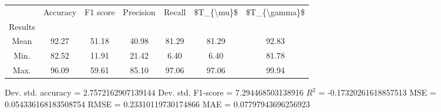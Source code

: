 \begin{tabular}{|c|c|c|c|c|c|c|}
\toprule
{} &  Accuracy &  F1 score &  Precision &  Recall &  \$T\_\{\textbackslash mu\}\$ &  \$T\_\{\textbackslash gamma\}\$ \\
Results &           &           &            &         &            &               \\
\hline
Mean    &     92.27 &     51.18 &      40.98 &   81.29 &      81.29 &         92.83 \\
Min.    &     82.52 &     11.91 &      21.42 &    6.40 &       6.40 &         81.78 \\
Max.    &     96.09 &     59.61 &      85.10 &   97.06 &      97.06 &         99.94 \\
\bottomrule
\end{tabular}

 Dev. std. accuracy = 2.7572162907139144
 Dev. std. F1-score = 7.294468503138916
 $R^2$ = -0.17320261618857513
 MSE = 0.054336168183508754
 RMSE = 0.23310119730174866
 MAE = 0.07797943696256923
